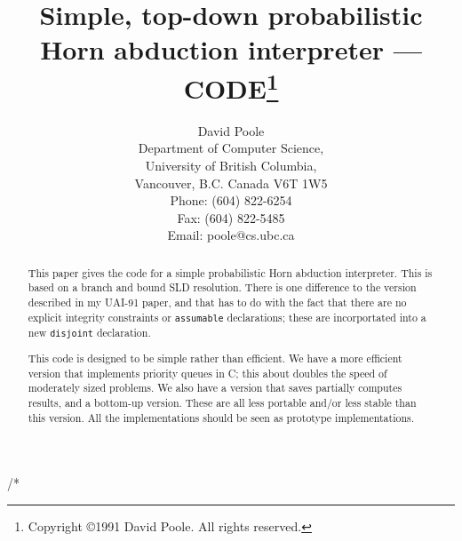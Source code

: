 /*
\pagestyle{myheadings}
\makeindex
\newtheorem{example}{Example}
\newtheorem{algorithm}{Algorithm}
\newtheorem{theorem}{Theorem}
\newtheorem{lemma}[theorem]{Lemma}
\newtheorem{definition}{Definition}
\newtheorem{corollary}[theorem]{Corollary}
\newenvironment{proof}{\begin{quote} {\bf Proof: }}{$\Box$\end{quote}}
\newenvironment{prolog}{\begin{tabbing} \hbox{2cm}\=\hbox{1cm}\=\kill
    }{\end{tabbing}}
\newcommand{\IF}{\ $:-$\\\>}
\newcommand{\AND}{,\\\>}
\title{Simple, top-down probabilistic Horn abduction interpreter
--- CODE\thanks{Copyright \copyright 1991 
David Poole. All rights reserved.}}
\author{David Poole\\
Department of Computer Science,\\
University of British Columbia,\\
Vancouver, B.C. Canada V6T 1W5\\
Phone: (604) 822-6254\\
Fax: (604) 822-5485\\
Email: poole@cs.ubc.ca}

\maketitle
\begin{abstract}
This paper gives the code for a simple probabilistic Horn abduction
interpreter. This is based on a branch and bound SLD resolution.
There is one difference to the version described in my UAI-91 paper,
and that has to do with the fact that there are no explicit integrity
constraints or {\tt assumable} declarations; these are incorportated
into a new {\tt disjoint} declaration.

This code is designed to be simple rather
than efficient. We have a more efficient version that implements
priority queues in C; this about doubles the speed of moderately sized
problems. We also have a version that saves partially computes results,
and a bottom-up version. These are all less portable and/or less stable
than this version. All the implementations should be seen as prototype
implementations. 
\end{abstract}

